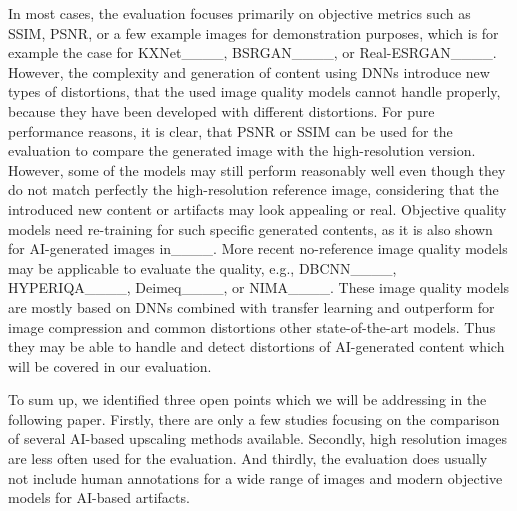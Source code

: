 In most cases, the evaluation focuses primarily on objective metrics such as SSIM, PSNR, or a few example images for demonstration purposes, which is for example the case for KXNet____, BSRGAN____, or Real-ESRGAN____.
However, the complexity and generation of content using DNNs introduce new types of distortions, that the used image quality models cannot handle properly, because they have been developed with different distortions.
For pure performance reasons, it is clear, that PSNR or SSIM can be used for the evaluation to compare the generated image with the high-resolution version.
However, some of the models may still perform reasonably well even though they do not match perfectly the high-resolution reference image, considering that the introduced new content or artifacts may look appealing or real.
Objective quality models need re-training for such specific generated contents, as it is also shown for AI-generated images in____.
More recent no-reference image quality models may be applicable to evaluate the quality, e.g., DBCNN____, HYPERIQA____, Deimeq____, or NIMA____.
These image quality models are mostly based on DNNs combined with transfer learning and outperform for image compression and common distortions other state-of-the-art models.
Thus they may be able to handle and detect distortions of AI-generated content which will be covered in our evaluation.

To sum up, we identified three open points which we will be addressing in the following paper.
Firstly, there are only a few studies focusing on the comparison of several AI-based upscaling methods available.
Secondly, high resolution images are less often used for the evaluation.
And thirdly, the evaluation does usually not include human annotations for a wide range of images and modern objective models for AI-based artifacts.